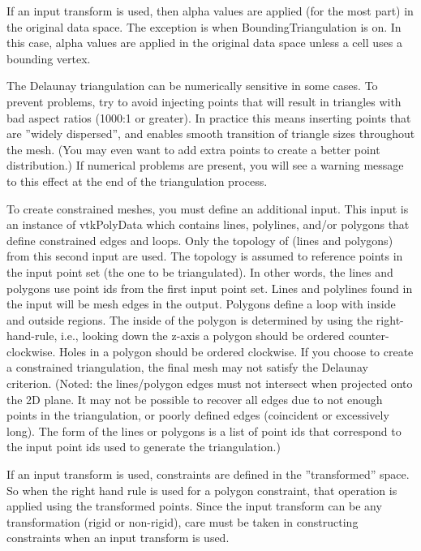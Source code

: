  If an input transform is used, then alpha values are applied (for the
 most part) in the original data space.  The exception is when
 BoundingTriangulation is on.  In this case, alpha values are applied in
 the original data space unless a cell uses a bounding vertex.  
 
 The Delaunay triangulation can be numerically sensitive in some cases. To
 prevent problems, try to avoid injecting points that will result in
 triangles with bad aspect ratios (1000:1 or greater). In practice this
 means inserting points that are ''widely dispersed'', and enables smooth
 transition of triangle sizes throughout the mesh. (You may even want to
 add extra points to create a better point distribution.) If numerical
 problems are present, you will see a warning message to this effect at
 the end of the triangulation process.

 To create constrained meshes, you must define an additional
 input. This input is an instance of vtkPolyData which contains
 lines, polylines, and/or polygons that define constrained edges and
 loops. Only the topology of (lines and polygons) from this second
 input are used.  The topology is assumed to reference points in the
 input point set (the one to be triangulated). In other words, the
 lines and polygons use point ids from the first input point
 set. Lines and polylines found in the input will be mesh edges in
 the output. Polygons define a loop with inside and outside
 regions. The inside of the polygon is determined by using the
 right-hand-rule, i.e., looking down the z-axis a polygon should be
 ordered counter-clockwise. Holes in a polygon should be ordered
 clockwise. If you choose to create a constrained triangulation, the
 final mesh may not satisfy the Delaunay criterion. (Noted: the
 lines/polygon edges must not intersect when projected onto the 2D
 plane.  It may not be possible to recover all edges due to not
 enough points in the triangulation, or poorly defined edges
 (coincident or excessively long).  The form of the lines or
 polygons is a list of point ids that correspond to the input point
 ids used to generate the triangulation.)

 If an input transform is used, constraints are defined in the
 ''transformed'' space.  So when the right hand rule is used for a
 polygon constraint, that operation is applied using the transformed
 points.  Since the input transform can be any transformation (rigid
 or non-rigid), care must be taken in constructing constraints when
 an input transform is used.


